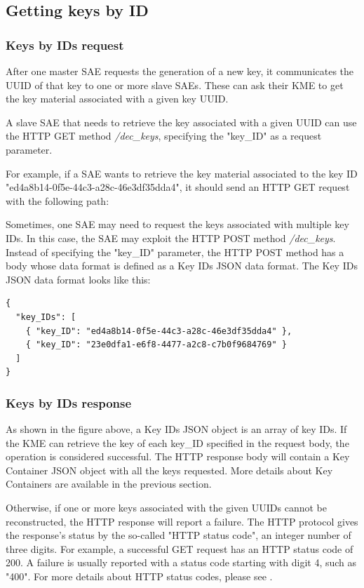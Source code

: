 \subsection{Getting keys by ID}

\subsubsection{Keys by IDs request}
After one master SAE requests the generation of a new key, it communicates the UUID of that key to one or more slave SAEs. These can ask their KME to get the key material associated with a given key UUID.

A slave SAE that needs to retrieve the key associated with a given UUID can use the HTTP GET method \textit{/dec\_keys}, specifying the "key\_ID" as a request parameter.

For example, if a SAE wants to retrieve the key material associated to the key ID "ed4a8b14-0f5e-44c3-a28c-46e3df35dda4", it should send an HTTP GET request with the following path:

Sometimes, one SAE may need to request the keys associated with multiple key IDs. In this case, the SAE may exploit the HTTP POST method \textit{/dec\_keys}. Instead of specifying the "key\_ID" parameter, the HTTP POST method has a body whose data format is defined as a Key IDs JSON data format. The Key IDs JSON data format looks like this:

\begin{verbatim}
{
  "key_IDs": [
    { "key_ID": "ed4a8b14-0f5e-44c3-a28c-46e3df35dda4" },
    { "key_ID": "23e0dfa1-e6f8-4477-a2c8-c7b0f9684769" }
  ]
}
\end{verbatim}

\subsubsection{Keys by IDs response}
As shown in the figure above, a Key IDs JSON object is an array of key IDs. If the KME can retrieve the key of each key\_ID specified in the request body, the operation is considered successful. The HTTP response body will contain a Key Container JSON object with all the keys requested. More details about Key Containers are available in the previous section.

Otherwise, if one or more keys associated with the given UUIDs cannot be reconstructed, the HTTP response will report a failure. The HTTP protocol gives the response's status by the so-called "HTTP status code", an integer number of three digits. For example, a successful GET request has an HTTP status code of 200. A failure is usually reported with a status code starting with digit 4, such as "400". For more details about HTTP status codes, please see \cite{http_status_codes}.

